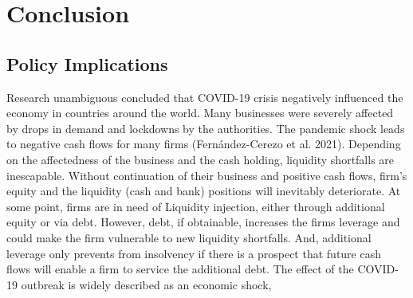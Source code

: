 
\chapter{Conclusion} %

\label{Chapter6} %


\section{Policy Implications}

Research unambiguous concluded that COVID-19 crisis negatively influenced the economy in countries around the world. Many businesses were severely affected by drops in demand and lockdowns by the authorities. The pandemic shock leads to negative cash flows for many firms (Fernández-Cerezo et al. 2021). Depending on the affectedness of the business and the cash holding, liquidity shortfalls are inescapable. 
Without continuation of their business and positive cash flows, firm’s equity and the liquidity (cash and bank) positions will inevitably deteriorate. At some point, firms are in need of Liquidity injection, either through additional equity or via debt. However, debt, if obtainable, increases the firms leverage and could make the firm vulnerable to new liquidity shortfalls. And, additional leverage only prevents from insolvency if there is a prospect that future cash flows will enable a firm to service the additional debt.
The effect of the COVID-19 outbreak is widely described as an economic shock,


